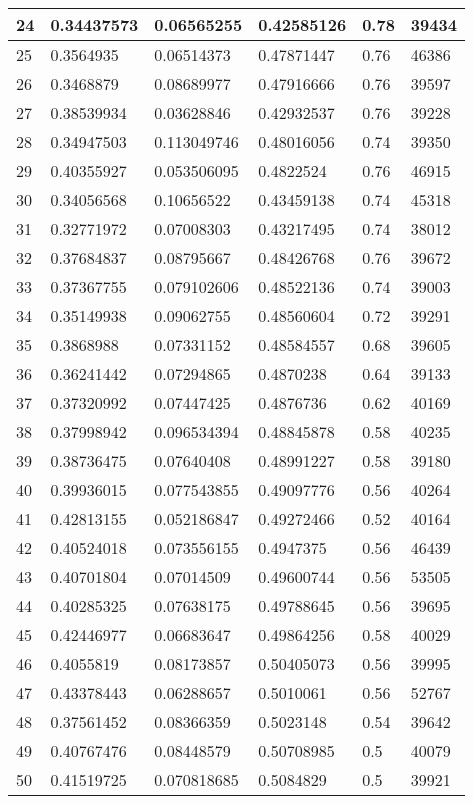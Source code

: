 \begin{longtable}{|l|l|l|l|l|l|}
24 & 0.34437573 & 0.06565255 & 0.42585126 & 0.78 & 39434 \\ \hline 
25 & 0.3564935 & 0.06514373 & 0.47871447 & 0.76 & 46386 \\ \hline 
26 & 0.3468879 & 0.08689977 & 0.47916666 & 0.76 & 39597 \\ \hline 
27 & 0.38539934 & 0.03628846 & 0.42932537 & 0.76 & 39228 \\ \hline 
28 & 0.34947503 & 0.113049746 & 0.48016056 & 0.74 & 39350 \\ \hline 
29 & 0.40355927 & 0.053506095 & 0.4822524 & 0.76 & 46915 \\ \hline 
30 & 0.34056568 & 0.10656522 & 0.43459138 & 0.74 & 45318 \\ \hline 
31 & 0.32771972 & 0.07008303 & 0.43217495 & 0.74 & 38012 \\ \hline 
32 & 0.37684837 & 0.08795667 & 0.48426768 & 0.76 & 39672 \\ \hline 
33 & 0.37367755 & 0.079102606 & 0.48522136 & 0.74 & 39003 \\ \hline 
34 & 0.35149938 & 0.09062755 & 0.48560604 & 0.72 & 39291 \\ \hline 
35 & 0.3868988 & 0.07331152 & 0.48584557 & 0.68 & 39605 \\ \hline 
36 & 0.36241442 & 0.07294865 & 0.4870238 & 0.64 & 39133 \\ \hline 
37 & 0.37320992 & 0.07447425 & 0.4876736 & 0.62 & 40169 \\ \hline 
38 & 0.37998942 & 0.096534394 & 0.48845878 & 0.58 & 40235 \\ \hline 
39 & 0.38736475 & 0.07640408 & 0.48991227 & 0.58 & 39180 \\ \hline 
40 & 0.39936015 & 0.077543855 & 0.49097776 & 0.56 & 40264 \\ \hline 
41 & 0.42813155 & 0.052186847 & 0.49272466 & 0.52 & 40164 \\ \hline 
42 & 0.40524018 & 0.073556155 & 0.4947375 & 0.56 & 46439 \\ \hline 
43 & 0.40701804 & 0.07014509 & 0.49600744 & 0.56 & 53505 \\ \hline 
44 & 0.40285325 & 0.07638175 & 0.49788645 & 0.56 & 39695 \\ \hline 
45 & 0.42446977 & 0.06683647 & 0.49864256 & 0.58 & 40029 \\ \hline 
46 & 0.4055819 & 0.08173857 & 0.50405073 & 0.56 & 39995 \\ \hline 
47 & 0.43378443 & 0.06288657 & 0.5010061 & 0.56 & 52767 \\ \hline 
48 & 0.37561452 & 0.08366359 & 0.5023148 & 0.54 & 39642 \\ \hline 
49 & 0.40767476 & 0.08448579 & 0.50708985 & 0.5 & 40079 \\ \hline 
50 & 0.41519725 & 0.070818685 & 0.5084829 & 0.5 & 39921 \\ \hline 
\end{longtable}